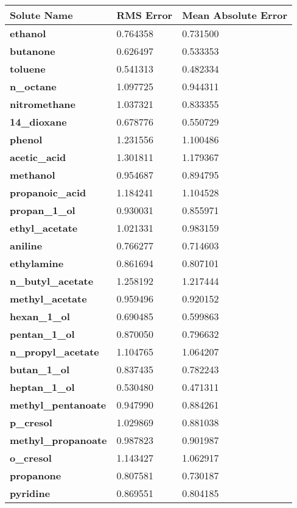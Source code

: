 \documentclass{amsart}
\begin{document}
 
\begin{center}
\begin{tabular}{|l|l|l|} 
\hline  
\textbf{Solute Name}&\textbf{RMS Error}&\textbf{Mean Absolute Error} \\ \hline
\hline 
\textbf{ethanol}&0.764358&0.731500 \\ \hline 
\textbf{butanone}&0.626497&0.533353 \\ \hline 
\textbf{toluene}&0.541313&0.482334 \\ \hline 
\textbf{n\_octane}&1.097725&0.944311 \\ \hline 
\textbf{nitromethane}&1.037321&0.833355 \\ \hline 
\textbf{14\_dioxane}&0.678776&0.550729 \\ \hline 
\textbf{phenol}&1.231556&1.100486 \\ \hline 
\textbf{acetic\_acid}&1.301811&1.179367 \\ \hline 
\textbf{methanol}&0.954687&0.894795 \\ \hline 
\textbf{propanoic\_acid}&1.184241&1.104528 \\ \hline 
\textbf{propan\_1\_ol}&0.930031&0.855971 \\ \hline 
\textbf{ethyl\_acetate}&1.021331&0.983159 \\ \hline 
\textbf{aniline}&0.766277&0.714603 \\ \hline 
\textbf{ethylamine}&0.861694&0.807101 \\ \hline 
\textbf{n\_butyl\_acetate}&1.258192&1.217444 \\ \hline 
\textbf{methyl\_acetate}&0.959496&0.920152 \\ \hline 
\textbf{hexan\_1\_ol}&0.690485&0.599863 \\ \hline 
\textbf{pentan\_1\_ol}&0.870050&0.796632 \\ \hline 
\textbf{n\_propyl\_acetate}&1.104765&1.064207 \\ \hline 
\textbf{butan\_1\_ol}&0.837435&0.782243 \\ \hline 
\textbf{heptan\_1\_ol}&0.530480&0.471311 \\ \hline 
\textbf{methyl\_pentanoate}&0.947990&0.884261 \\ \hline 
\textbf{p\_cresol}&1.029869&0.881038 \\ \hline 
\textbf{methyl\_propanoate}&0.987823&0.901987 \\ \hline 
\textbf{o\_cresol}&1.143427&1.062917 \\ \hline 
\textbf{propanone}&0.807581&0.730187 \\ \hline 
\textbf{pyridine}&0.869551&0.804185 \\ \hline 
\end{tabular} 
\end{center} 
\end{document}
